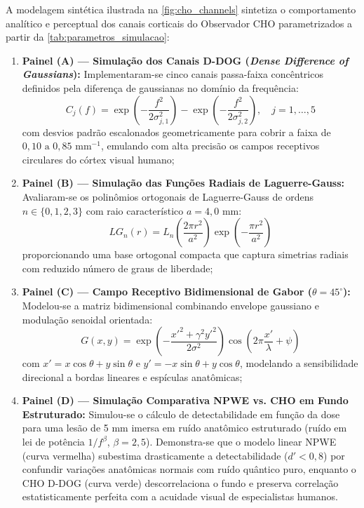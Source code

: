 \documentclass[
  12pt,
  a4paper,
  oneside
]{report}
\begin{document}
A modelagem sintética ilustrada na \cref{fig:cho_channels} sintetiza o comportamento analítico e perceptual dos canais corticais do Observador CHO parametrizados a partir da \cref{tab:parametros_simulacao}:
\begin{enumerate}
  \item \textbf{Painel (A) --- Simulação dos Canais D-DOG (\emph{Dense Difference of Gaussians}):}
  Implementaram-se cinco canais passa-faixa concêntricos definidos pela diferença de gaussianas no domínio da frequência:
  \begin{equation}
    C_j(f) = \exp\left( -\frac{f^2}{2\sigma_{j,1}^2} \right) - \exp\left( -\frac{f^2}{2\sigma_{j,2}^2} \right), \quad j = 1, \dots, 5
    \label{eq:ddog_formula}
  \end{equation}
  com desvios padrão escalonados geometricamente para cobrir a faixa de $0{,}10\text{ a }0{,}85\text{ mm}^{-1}$, emulando com alta precisão os campos receptivos circulares do córtex visual humano;

  \item \textbf{Painel (B) --- Simulação das Funções Radiais de Laguerre-Gauss:}
  Avaliaram-se os polinômios ortogonais de Laguerre-Gauss de ordens $n \in \{0, 1, 2, 3\}$ com raio característico $a = 4{,}0\text{ mm}$:
  \begin{equation}
    LG_n(r) = L_n\left( \frac{2\pi r^2}{a^2} \right) \exp\left( -\frac{\pi r^2}{a^2} \right)
    \label{eq:laguerre_gauss_formula}
  \end{equation}
  proporcionando uma base ortogonal compacta que captura simetrias radiais com reduzido número de graus de liberdade;

  \item \textbf{Painel (C) --- Campo Receptivo Bidimensional de Gabor ($\theta = 45^\circ$):}
  Modelou-se a matriz bidimensional combinando envelope gaussiano e modulação senoidal orientada:
  \begin{equation}
    G(x, y) = \exp\left( -\frac{x'^2 + \gamma^2 y'^2}{2\sigma^2} \right) \cos\left( 2\pi \frac{x'}{\lambda} + \psi \right)
    \label{eq:gabor_formula}
  \end{equation}
  com $x' = x\cos\theta + y\sin\theta$ e $y' = -x\sin\theta + y\cos\theta$, modelando a sensibilidade direcional a bordas lineares e espículas anatômicas;

  \item \textbf{Painel (D) --- Simulação Comparativa NPWE vs. CHO em Fundo Estruturado:}
  Simulou-se o cálculo de detectabilidade em função da dose para uma lesão de 5 mm imersa em ruído anatômico estruturado (ruído em lei de potência $1/f^\beta$, $\beta = 2{,}5$). Demonstra-se que o modelo linear NPWE (curva vermelha) subestima drasticamente a detectabilidade ($d' < 0{,}8$) por confundir variações anatômicas normais com ruído quântico puro, enquanto o CHO D-DOG (curva verde) descorrelaciona o fundo e preserva correlação estatisticamente perfeita com a acuidade visual de especialistas humanos.
\end{enumerate}
\end{document}
